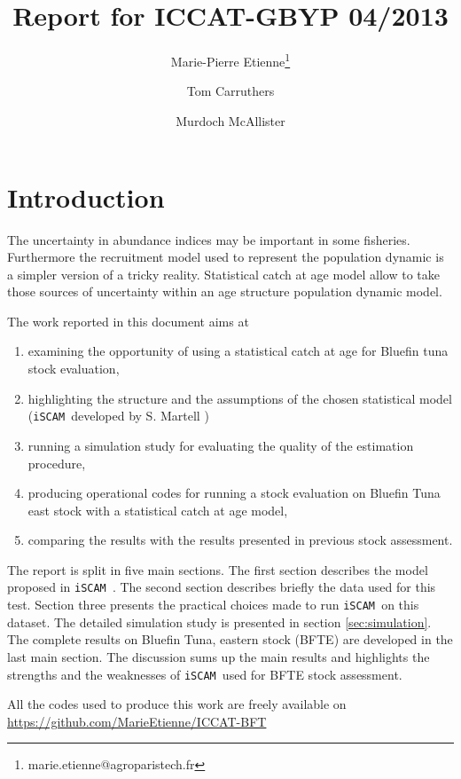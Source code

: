 \documentclass[ 12pt]{article}\usepackage{graphicx, color}
\title{Report for ICCAT-GBYP 04/2013}
\author[1]{Marie-Pierre Etienne\thanks{marie.etienne@agroparistech.fr}}
\author[2]{Tom Carruthers }
\author[2]{Murdoch McAllister}
\affil[1]{AgroParisTech}
\affil[2]{UBC}
\newcommand{\iscam}{\texttt{iSCAM }}
\begin{document}
\graphicspath{{/home/metienne/ICCAT/ICCAT-BFT/Report/figure}}
 






\maketitle
\tableofcontents


\section{Introduction}
The uncertainty in abundance indices may be important in some fisheries. Furthermore the recruitment model used to represent the population dynamic is a simpler version of a tricky reality.
Statistical catch at age model allow to take those sources of uncertainty within an age structure population dynamic model.

The work reported in this document aims at 
\begin{enumerate}
 \item examining the opportunity of using a statistical catch at age for Bluefin tuna stock evaluation,
 \item highlighting the structure and the assumptions of the chosen statistical model (\iscam developed by S. Martell \cite{Martell12})
 \item running a simulation study for evaluating the quality of the estimation procedure,
  \item producing operational codes for running a stock evaluation on Bluefin Tuna east stock with a statistical catch at age model,
  \item comparing the results with the results presented in previous stock assessment.
  \end{enumerate}
  
The report is split in five main sections. The first section describes the model proposed in \iscam. The second section describes briefly the data used  for this test.
Section three presents the practical choices made to run \iscam on this dataset. 
The detailed simulation study is presented in section \ref{sec:simulation}.
The complete results on Bluefin Tuna, eastern stock (BFTE) are developed in the last main section. The discussion sums up the main results and highlights the strengths and the weaknesses of \iscam used for BFTE stock assessment.

All the codes used to produce this work are freely available on \url{https://github.com/MarieEtienne/ICCAT-BFT}
\end{document}
